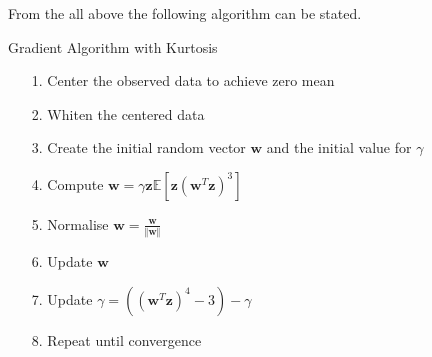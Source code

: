 From the all above the following algorithm can be stated.
\begin{algorithm}[H]
\caption{Gradient Algorithm with Kurtosis}
\begin{itemize}
\item[1.] Center the observed data to achieve zero mean
\item[2.] Whiten the centered data
\item[3.] Create the initial random vector $\mathbf{w}$ and the initial value for $\gamma$
\item[4.] Compute $\mathbf{w} = \gamma \mathbf{z} \mathbb{E}[\mathbf{z} (\mathbf{w}^T \mathbf{z})^3]$
\item[5.] Normalise $\mathbf{w} = \frac{\mathbf{w}}{\Vert \mathbf{w} \Vert}$
\item[6.] Update $\mathbf{w}$
\item[7.] Update $\gamma = ((\mathbf{w}^T \mathbf{z})^4 - 3) - \gamma$
\item[8.] Repeat until convergence
\end{itemize}
\end{algorithm}

